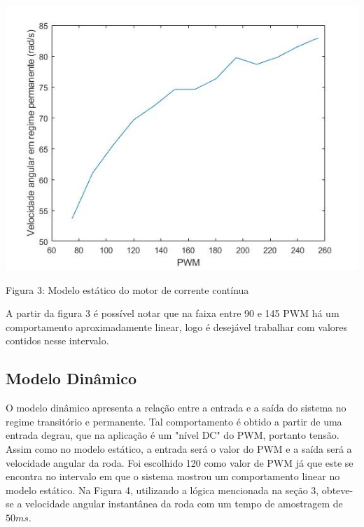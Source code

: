 \documentclass{article}
\begin{document}
\begin{center}
\centering
  \includegraphics[scale=0.5]{imagens/untitled.jpg}
  
  \caption{Figura 3: Modelo estático do motor de corrente contínua}
\end{center}

A partir da figura 3 é possível notar que na faixa entre 90 e 145 PWM há um comportamento aproximadamente linear, logo é desejável trabalhar com valores contidos nesse intervalo.


\subsection{Modelo Dinâmico}
O modelo dinâmico apresenta a relação entre a entrada e a saída do sistema no regime transitório e permanente. Tal comportamento é obtido a partir de uma entrada degrau, que na aplicação é um "nível DC" do PWM, portanto tensão.
Assim como no modelo estático, a entrada será o valor do PWM e a saída será a velocidade angular da roda. Foi escolhido 120 como valor de PWM já que este se encontra no intervalo em que o sistema mostrou um comportamento linear no modelo estático. Na Figura 4, utilizando a lógica mencionada na seção 3, obteve-se a velocidade angular instantânea da roda com um tempo de amostragem de $50ms$.
\end{document}
